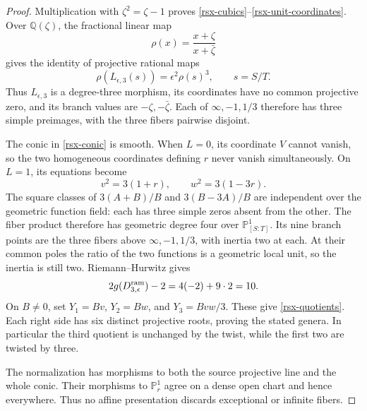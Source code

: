 \begin{proof}
Multiplication with \(\zeta^2=\zeta-1\) proves
\eqref{rsx-cubics}--\eqref{rsx-unit-coordinates}.
Over \(\mathbb Q(\zeta)\), the fractional linear map
\[
 \rho(x)=\frac{x+\zeta}{x+\bar\zeta}
\]
gives the identity of projective rational maps
\begin{equation}
 \rho(L_{\epsilon,3}(s))=\epsilon^2\rho(s)^3,\qquad s=S/T.
 \label{rsx-conjugacy}
\end{equation}
Thus \(L_{\epsilon,3}\) is a degree-three morphism, its
coordinates have no common projective zero, and its branch
values are \(-\zeta,-\bar\zeta\). Each of
\(\infty,-1,1/3\) therefore has three simple preimages,
with the three fibers pairwise disjoint.

The conic in \eqref{rsx-conic} is smooth. When \(L=0\),
its coordinate \(V\) cannot vanish, so the two homogeneous
coordinates defining \(r\) never vanish simultaneously.
On \(L=1\), its equations become
\begin{equation}
 v^2=3(1+r),\qquad w^2=3(1-3r).
 \label{rsx-affine-squares}
\end{equation}
The square classes of \(3(A+B)/B\) and \(3(B-3A)/B\)
are independent over the geometric function field: each has
three simple zeros absent from the other. The fiber product
therefore has geometric degree four over \(\mathbb P^1_{[S:T]}\).
Its nine branch points are the three fibers above
\(\infty,-1,1/3\), with inertia two at each. At their
common poles the ratio of the two functions is a geometric
local unit, so the inertia is still two. Riemann--Hurwitz gives
\[
 2g(D^{\rm ram}_{3,\epsilon})-2=4(-2)+9\cdot2=10.
\]
On \(B\ne0\), set \(Y_1=Bv\), \(Y_2=Bw\), and
\(Y_3=Bvw/3\). These give \eqref{rsx-quotients}.
Each right side has six distinct projective roots, proving
the stated genera. In particular the third quotient is
unchanged by the twist, while the first two are twisted by three.

The normalization has morphisms to both the source projective
line and the whole conic. Their morphisms to \(\mathbb P^1_r\)
agree on a dense open chart and hence everywhere. Thus no
affine presentation discards exceptional or infinite fibers.
\end{proof}


